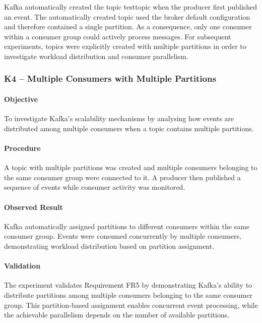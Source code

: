\documentclass{scrartcl}
\begin{document}
Kafka automatically created the topic testtopic when the producer first published an event. The automatically created topic used the broker default configuration and therefore contained a single partition. As a consequence, only one consumer within a consumer group could actively process messages. For subsequent experiments, topics were explicitly created with multiple partitions in order to investigate workload distribution and consumer parallelism.

\subsubsection{K4 -- Multiple Consumers with Multiple Partitions}

\paragraph{Objective}

To investigate Kafka's scalability mechanisms by analysing how events are distributed among multiple consumers when a topic contains multiple partitions.

\paragraph{Procedure}

A topic with multiple partitions was created and multiple consumers belonging to the same consumer group were connected to it. A producer then published a sequence of events while consumer activity was monitored.

\paragraph{Observed Result}

Kafka automatically assigned partitions to different consumers within the same consumer group. Events were consumed concurrently by multiple consumers, demonstrating workload distribution based on partition assignment.

\paragraph{Validation}

The experiment validates Requirement FR5 by demonstrating Kafka's ability to distribute partitions among multiple consumers belonging to the same consumer group. This partition-based assignment enables concurrent event processing, while the achievable parallelism depends on the number of available partitions.
\end{document}
